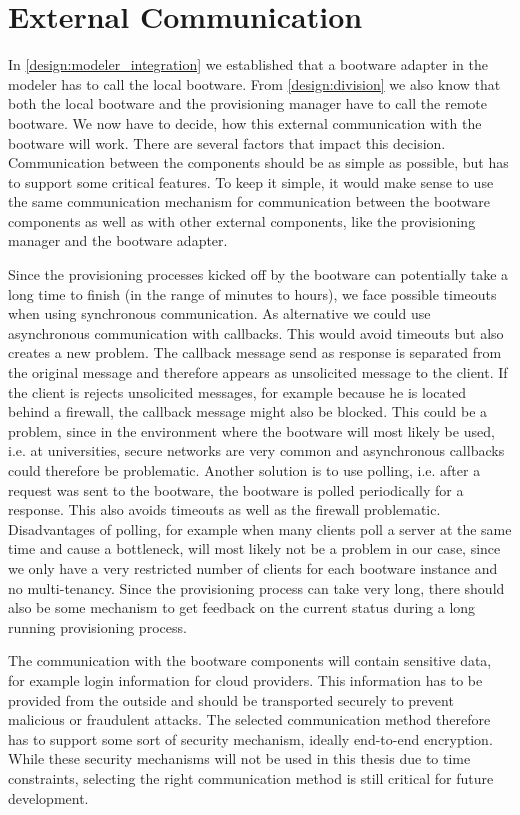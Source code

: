 \section{External Communication}
\label{design:communication}

In \autoref{design:modeler_integration} we established that a bootware adapter in the modeler has to call the local bootware.
From \autoref{design:division} we also know that both the local bootware and the provisioning manager have to call the remote bootware.
We now have to decide, how this external communication with the bootware will work.
There are several factors that impact this decision.
Communication between the components should be as simple as possible, but has to support some critical features.
To keep it simple, it would make sense to use the same communication mechanism for communication between the bootware components as well as with other external components, like the provisioning manager and the bootware adapter.

Since the provisioning processes kicked off by the bootware can potentially take a long time to finish (in the range of minutes to hours), we face possible timeouts when using synchronous communication.
As alternative we could use asynchronous communication with callbacks.
This would avoid timeouts but also creates a new problem.
The callback message send as response is separated from the original message and therefore appears as unsolicited message to the client.
If the client is rejects unsolicited messages, for example because he is located behind a firewall, the callback message might also be blocked.
This could be a problem, since in the environment where the bootware will most likely be used, i.e. at universities, secure networks are very common and asynchronous callbacks could therefore be problematic.
Another solution is to use polling, i.e. after a request was sent to the bootware, the bootware is polled periodically for a response.
This also avoids timeouts as well as the firewall problematic.
Disadvantages of polling, for example when many clients poll a server at the same time and cause a bottleneck, will most likely not be a problem in our case, since we only have a very restricted number of clients for each bootware instance and no multi-tenancy.
Since the provisioning process can take very long, there should also be some mechanism to get feedback on the current status during a long running provisioning process.

The communication with the bootware components will contain sensitive data, for example login information for cloud providers.
This information has to be provided from the outside and should be transported securely to prevent malicious or fraudulent attacks.
The selected communication method therefore has to support some sort of security mechanism, ideally end-to-end encryption.
While these security mechanisms will not be used in this thesis due to time constraints, selecting the right communication method is still critical for future development.

